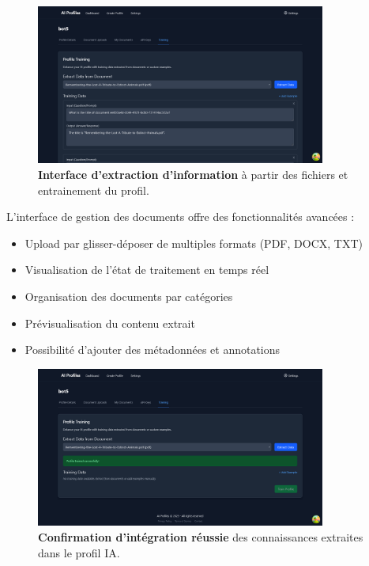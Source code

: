 \begin{figure}[H]
  \centering
  \includegraphics[width=0.85\textwidth,keepaspectratio]{pfe-pics/ai-profile-creation/extract_info_from_file_and_training_pfrile.png}
  \caption{\textbf{Interface d'extraction d'information} à partir des fichiers et entrainement du profil.}
  \label{fig:document_extraction}
\end{figure}

L'interface de gestion des documents offre des fonctionnalités avancées :

\begin{itemize}
  \item Upload par glisser-déposer de multiples formats (PDF, DOCX, TXT)
  \item Visualisation de l'état de traitement en temps réel
  \item Organisation des documents par catégories
  \item Prévisualisation du contenu extrait
  \item Possibilité d'ajouter des métadonnées et annotations
\end{itemize}

\begin{figure}[H]
  \centering
  \includegraphics[width=0.85\textwidth,keepaspectratio]{pfe-pics/ai-profile-creation/succesful_knoladge_integration.png}
  \caption{\textbf{Confirmation d'intégration réussie} des connaissances extraites dans le profil IA.}
  \label{fig:knowledge_integration}
\end{figure}

